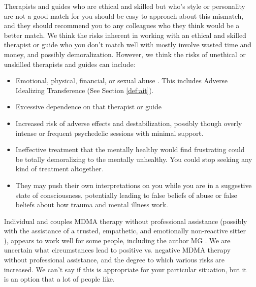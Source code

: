 \documentclass[12pt,letterpaper]{book}
\begin{document}
Therapists and guides who are ethical and skilled but who's style or personality are not a good match for you should be easy to approach about this mismatch, and they should recommend you to any colleagues who they think would be a better match. We think the risks inherent in working with an ethical and skilled therapist or guide who you don't match well with mostly involve wasted time and money, and possibly demoralization. However, we think the risks of unethical or unskilled therapists and guides can include:
\begin{itemize}
    \item Emotional, physical, financial, or sexual abuse \cite{powerTrip}. This includes Adverse Idealizing Transference (See Section \ref{def:ait}).
    \item Excessive dependence on that therapist or guide \cite{powerTrip}
    \item Increased risk of adverse effects and destabilization, possibly though overly intense or frequent psychedelic sessions with minimal support.
    \item Ineffective treatment that the mentally healthy would find frustrating could be totally demoralizing to the mentally unhealthy. You could stop seeking any kind of treatment altogether.
    \item They may push their own interpretations on you while you are in a suggestive state of consciousness, potentially leading to false beliefs of abuse \cite{Scoboria07022017} or false beliefs about how trauma and mental illness work.
\end{itemize}

Individual and couples MDMA therapy without professional assistance (possibly with the assistance of a trusted, empathetic, and emotionally non-reactive sitter \cite{thalSitter}), appears to work well for some people, including the author MG \cite{hillsSolo,colbertEvenings}. We are uncertain what circumstances lead to positive vs. negative MDMA therapy without professional assistance, and the degree to which various risks are increased. We can't say if this is appropriate for your particular situation, but it is an option that a lot of people like.
\end{document}
